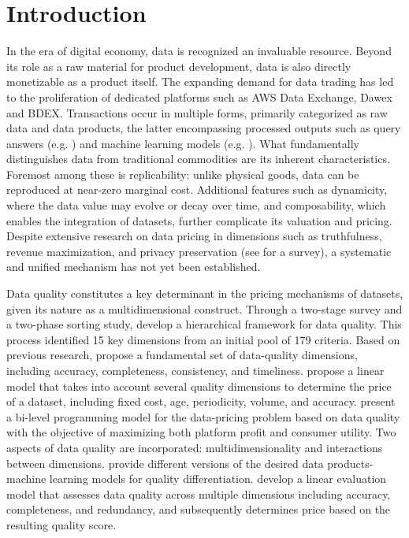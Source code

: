 \documentclass[11pt]{article}
\numberwithin{equation}{section}
\begin{document}
	\section{Introduction}
		In the era of digital economy, data is recognized an invaluable resource. Beyond its role as a raw material for product development, data is also directly monetizable as a product itself.  The expanding demand for data trading has led to the proliferation of dedicated platforms such as AWS Data Exchange, Dawex and BDEX. Transactions occur in multiple forms, primarily categorized as raw data and data products, the latter encompassing processed outputs such as query answers (e.g. \cite{KU15}) and machine learning models (e.g. \cite{LL21}). What fundamentally distinguishes data from traditional commodities are its inherent characteristics. Foremost among these is replicability: unlike physical goods, data can be reproduced at near-zero marginal cost. Additional features such as dynamicity, where the data value may evolve or decay over time, and composability, which enables the integration of datasets, further complicate its valuation and pricing. Despite extensive research on data pricing in dimensions such as truthfulness, revenue maximization, and privacy preservation (see \cite{P22} for a survey), a systematic and unified mechanism has not yet been established.
			
	
Data quality constitutes a key determinant in the pricing mechanisms of datasets, given its nature as a multidimensional construct. Through a two-stage survey and a two-phase sorting study, \cite{W96} develop a hierarchical framework for data quality. This process identified 15 key dimensions from an initial pool of 179 criteria. Based on previous research, \cite{B09} propose a fundamental set of data-quality dimensions, including accuracy, completeness, consistency, and timeliness. \cite{H15} propose a linear model that takes into account several  quality dimensions to determine the price of a dataset, including fixed cost, age, periodicity, volume, and accuracy. \cite{Y17} present a bi-level programming model for the data-pricing problem based on data quality with the objective of maximizing both platform profit and consumer utility. Two aspects of data quality are incorporated: multidimensionality and interactions between dimensions. \cite{CK19} provide different versions of the desired data products-machine learning models for quality differentiation. %
\cite{YZ19} develop a linear evaluation model that assesses data quality across multiple dimensions including accuracy, completeness, and redundancy, and subsequently determines price based on the resulting quality score.
	
\end{document}
